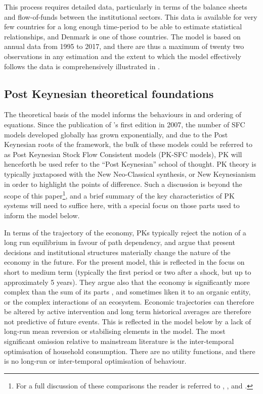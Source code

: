 \documentclass[
]{book}
\begin{document}
This process requires detailed data, particularly in terms of the balance sheets and flow-of-funds between the institutional sectors. This data is available for very few countries for a long enough time-period to be able to estimate statistical relationships, and Denmark is one of those countries. The model is based on annual data from 1995 to 2017, and there are thus a maximum of twenty two observations in any estimation and the extent to which the model effectively follows the data is comprehensively illustrated in \citet{byrialsenraza2019empirical}.

\hypertarget{post-keynesian-theoretical-foundations}{%
\subsection{Post Keynesian theoretical foundations}\label{post-keynesian-theoretical-foundations}}

The theoretical basis of the model informs the behaviours in and ordering of equations. Since the publication of \citet{godleylavoie2012}'s first edition in 2007, the number of SFC models developed globally has grown exponentially, and due to the Post Keynesian roots of the framework, the bulk of these models could be referred to as Post Keynesian Stock Flow Consistent models (PK-SFC models), PK will henceforth be used refer to the ``Post Keynesian'' school of thought. PK theory is typically juxtaposed with the New Neo-Classical synthesis, or New Keynesianism in order to highlight the points of difference. Such a discussion is beyond the scope of this paper\footnote{For a full discussion of these comparisons the reader is referred to \citet{dow1985}, \citet{dow2001pkm}, \citet{chickdow2001flr} and \citet{chick2003}.}, and a brief summary of the key characteristics of PK systems will need to suffice here, with a special focus on those parts used to inform the model below.

In terms of the trajectory of the economy, PKs typically reject the notion of a long run equilibrium in favour of path dependency, and argue that present decisions and institutional structures materially change the nature of the economy in the future. For the present model, this is reflected in the focus on short to medium term (typically the first period or two after a shock, but up to approximately 5 years). They argue also that the economy is significantly more complex than the sum of its parts \citep{chick2003}, and sometimes liken it to an organic entity, or the complex interactions of an ecosystem. Economic trajectories can therefore be altered by active intervention and long term historical averages are therefore not predictive of future events. This is reflected in the model below by a lack of long-run mean reversion or stabilising elements in the model. The most significant omission relative to mainstream literature is the inter-temporal optimisation of household consumption. There are no utility functions, and there is no long-run or inter-temporal optimisation of behaviour.
\end{document}
